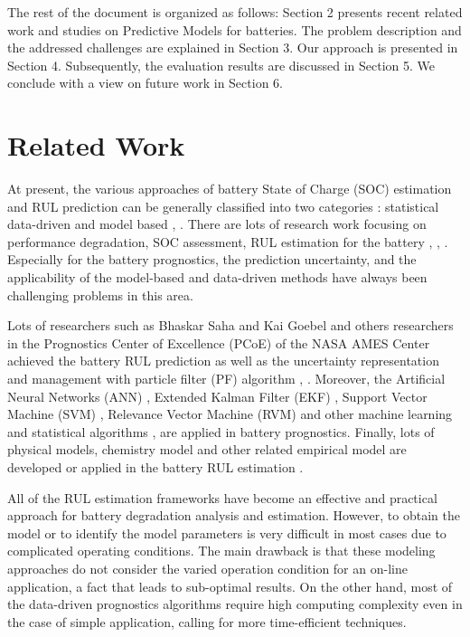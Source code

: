 The rest of the document is organized as follows: Section 2 presents recent related work and studies on Predictive Models for \lib  batteries. The problem description and the addressed challenges are explained in Section 3. Our approach is presented in Section 4. Subsequently, the evaluation results are discussed in Section 5. We conclude with a view on future work in Section 6.

\section{Related Work}
At present, the various approaches of battery State of Charge (SOC) estimation and RUL prediction can be generally classified into two categories \cite{Liu:2014:LBR:2662603.2662621}: statistical data-driven and model based \cite{ZHANG20116007}, \cite{Si2011RemainingUL}. There are lots of research work focusing on performance degradation, SOC assessment, RUL estimation for the \lib battery
\cite{Bhaskar01}, \cite{4579269}, \cite{zio:hal-00609502}. Especially for the
\lib battery prognostics, the prediction uncertainty, and
the applicability of the model-based and data-driven methods have always
been challenging problems in this area.

Lots of researchers such as Bhaskar Saha and Kai Goebel
and others researchers in the Prognostics Center of
Excellence (PCoE) of the NASA AMES Center achieved
the battery RUL prediction as well as the uncertainty
representation and management with particle filter (PF)
algorithm \cite{Bhaskar01}, \cite{4579269}. Moreover, the Artificial Neural
Networks (ANN) \cite{liu_2010}, Extended Kalman
Filter (EKF) \cite{1159187}, Support Vector Machine (SVM) \cite{4655607}, Relevance
Vector Machine (RVM) \cite{doi:10.1177/0142331208092030} and other machine
learning and statistical algorithms \cite{RICHARDSON2017209}, \cite{BRONDANI2017} are applied in \lib
battery prognostics. Finally, lots of physical
models, chemistry model and other related empirical model
are developed or applied in the battery RUL estimation \cite{FLEISCHER2014276}.

All of the RUL estimation frameworks have become an effective
and practical approach for \lib battery degradation
analysis and estimation. However, to obtain the model or to identify the
model parameters is very difficult in most cases due to complicated operating conditions. The main drawback is that these modeling approaches do not consider the varied operation condition for an on-line application, a fact that leads to sub-optimal results. On the
other hand, most of the data-driven prognostics algorithms
require high computing complexity even in the case of simple application, calling for more time-efficient techniques.

